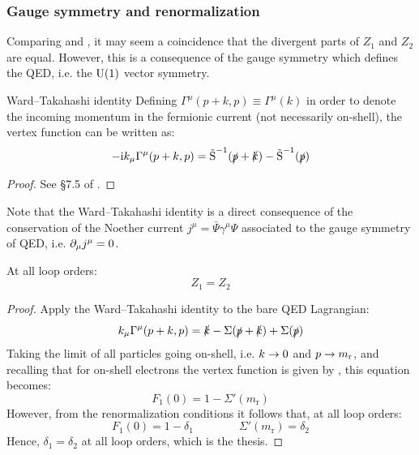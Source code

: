 \subsubsection{Gauge symmetry and renormalization}

Comparing  and , it may seem a coincidence that the divergent parts of $ Z_1 $ and $ Z_2 $ are equal. However, this is a consequence of the gauge symmetry which defines the QED, i.e. the $ \mathrm{U}(1) $ vector symmetry.

\begin{lemma}{Ward--Takahashi identity}{}
  Defining $ \Gamma^\mu(p + k , p) \equiv \Gamma^\mu(k) $ in order to denote the incoming momentum in the fermionic current (not necessarily on-shell), the vertex function can be written as:
  \begin{equation}
    - \mathrm{i} k_\mu \Gamma^\mu(p + k , p) = \tilde{\text{S}}^{-1}(\slashed{p} + \slashed{k}) - \tilde{\text{S}}^{-1}(\slashed{p})
  \end{equation}
\end{lemma}

\begin{proofbox}
  \begin{proof}
    See §7.5 of \cite{peskin}.
  \end{proof}
\end{proofbox}

Note that the Ward--Takahashi identity is a direct consequence of the conservation of the Noether current $ j^\mu = \bar{\Psi} \gamma^\mu \Psi $ associated to the gauge symmetry of QED, i.e. $ \partial_\mu j^\mu = 0 $.

\begin{proposition}{}{}
  At all loop orders:
  \begin{equation}
    Z_1 = Z_2
  \end{equation}
\end{proposition}

\begin{proofbox}
  \begin{proof}
    Apply the Ward--Takahashi identity to the bare QED Lagrangian:
    \begin{equation*}
      k_\mu \Gamma^\mu(p + k , p) = \slashed{k} - \Sigma(\slashed{p} + \slashed{k}) + \Sigma(\slashed{p})
    \end{equation*}
    Taking the limit of all particles going on-shell, i.e. $ k \rightarrow 0 $ and $ p \rightarrow m_\text{r} $, and recalling that for on-shell electrons the vertex function is given by , this equation becomes:
    \begin{equation*}
      F_1(0) = 1 - \Sigma'(m_\text{r})
    \end{equation*}
    However, from the renormalization conditions\footnotemark {} it follows that, at all loop orders:
    \begin{equation*}
      F_1(0) = 1 - \delta_1
      \qquad \qquad
      \Sigma'(m_\text{r}) = \delta_2
    \end{equation*}
    Hence, $ \delta_1 = \delta_2 $ at all loop orders, which is the thesis.
  \end{proof}
\end{proofbox}


